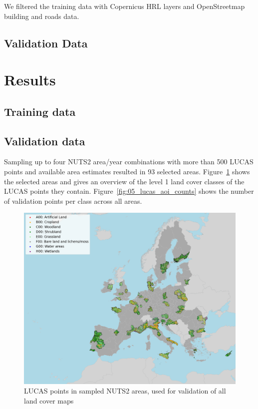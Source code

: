 We filtered the training data with Copernicus HRL layers and OpenStreetmap building and roads data. 

\subsection{Validation Data}

\section{Results}
\subsection{Training data}



\subsection{Validation data}

Sampling up to four NUTS2 area/year combinations with more than 500 LUCAS points and available area estimates resulted in 93 selected areas. Figure~\ref{fig:05_lucas_aoi} shows the selected areas and gives an overview of the level 1 land cover classes of the LUCAS points they contain. Figure~\ref{fig:05_lucas_aoi_counts} shows the number of validation points per class across all areas.

\begin{figure}[h]
    \centering
    \includegraphics[width=\textwidth]{figs_05/fig_lucas_aoi.png}
    \caption{LUCAS points in sampled NUTS2 areas, used for validation of all land cover maps}
    \label{fig:05_lucas_aoi}
\end{figure}

